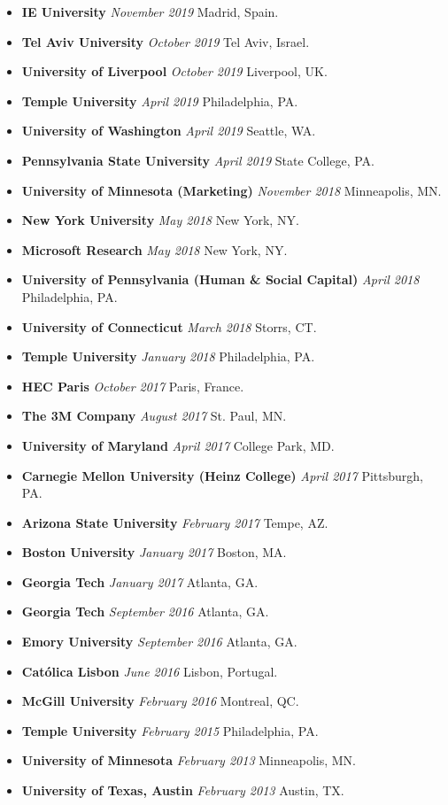 \documentclass[10.5pt,letterpaper,sans]{moderncv}        %
\begin{document}
\begin{itemize}
\item \textbf{IE University} \textit{November 2019} Madrid, Spain.
\item \textbf{Tel Aviv University} \textit{October 2019} Tel Aviv, Israel.
\item \textbf{University of Liverpool} \textit{October 2019} Liverpool, UK.
\item \textbf{Temple University} \textit{April 2019} Philadelphia, PA.
\item \textbf{University of Washington} \textit{April 2019} Seattle, WA.
\item \textbf{Pennsylvania State University} \textit{April 2019} State College, PA.
\item \textbf{University of Minnesota (Marketing)} \textit{November 2018} Minneapolis, MN.
\item \textbf{New York University} \textit{May 2018} New York, NY.
\item \textbf{Microsoft Research} \textit{May 2018} New York, NY.
\item \textbf{University of Pennsylvania (Human \& Social Capital)} \textit{April 2018} Philadelphia, PA.
\item \textbf{University of Connecticut} \textit{March 2018} Storrs, CT.
\item \textbf{Temple University} \textit{January 2018} Philadelphia, PA.
\item \textbf{HEC Paris} \textit{October 2017} Paris, France.
\item \textbf{The 3M Company} \textit{August 2017} St. Paul, MN.
\item \textbf{University of Maryland} \textit{April 2017} College Park, MD.
\item \textbf{Carnegie Mellon University (Heinz College)} \textit{April 2017} Pittsburgh, PA.
\item \textbf{Arizona State University} \textit{February 2017} Tempe, AZ.
\item \textbf{Boston University} \textit{January 2017} Boston, MA.
\item \textbf{Georgia Tech} \textit{January 2017} Atlanta, GA.
\item \textbf{Georgia Tech} \textit{September 2016} Atlanta, GA.
\item \textbf{Emory University} \textit{September 2016} Atlanta, GA.
\item \textbf{Cat\'olica Lisbon} \textit{June 2016} Lisbon, Portugal.
\item \textbf{McGill University} \textit{February 2016} Montreal, QC.
\item \textbf{Temple University} \textit{February 2015} Philadelphia, PA.
\item \textbf{University of Minnesota} \textit{February 2013} Minneapolis, MN.
\item \textbf{University of Texas, Austin} \textit{February 2013} Austin, TX.

\end{itemize}
\end{document}
